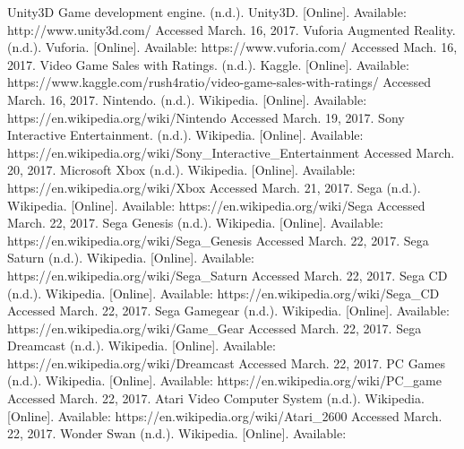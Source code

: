 

%
%

\begin{thebibliography}{1}
  Unity3D Game development engine. (n.d.). Unity3D. [Online]. Available:
  http://www.unity3d.com/
  Accessed March. 16, 2017.
  Vuforia Augmented Reality. (n.d.). Vuforia. [Online]. Available:
  https://www.vuforia.com/
  Accessed Mach. 16, 2017.
  Video Game Sales with Ratings. (n.d.). Kaggle. [Online]. Available:
  https://www.kaggle.com/rush4ratio/video-game-sales-with-ratings/
  Accessed March. 16, 2017.
  Nintendo. (n.d.). Wikipedia. [Online]. Available:
  https://en.wikipedia.org/wiki/Nintendo
  Accessed March. 19, 2017.
  Sony Interactive Entertainment. (n.d.). Wikipedia. [Online]. Available:
  https://en.wikipedia.org/wiki/Sony\_Interactive\_Entertainment
  Accessed March. 20, 2017.
  Microsoft Xbox (n.d.). Wikipedia. [Online]. Available:
  https://en.wikipedia.org/wiki/Xbox
  Accessed March. 21, 2017.
  Sega (n.d.). Wikipedia. [Online]. Available:
  https://en.wikipedia.org/wiki/Sega
  Accessed March. 22, 2017.
  Sega Genesis (n.d.). Wikipedia. [Online]. Available:
  https://en.wikipedia.org/wiki/Sega\_Genesis
  Accessed March. 22, 2017.
  Sega Saturn (n.d.). Wikipedia. [Online]. Available:
  https://en.wikipedia.org/wiki/Sega\_Saturn
  Accessed March. 22, 2017.
  Sega CD (n.d.). Wikipedia. [Online]. Available:
  https://en.wikipedia.org/wiki/Sega\_CD
  Accessed March. 22, 2017.
  Sega Gamegear (n.d.). Wikipedia. [Online]. Available:
  https://en.wikipedia.org/wiki/Game\_Gear
  Accessed March. 22, 2017.
  Sega Dreamcast (n.d.). Wikipedia. [Online]. Available:
  https://en.wikipedia.org/wiki/Dreamcast
  Accessed March. 22, 2017.
  PC Games (n.d.). Wikipedia. [Online]. Available:
  https://en.wikipedia.org/wiki/PC\_game
  Accessed March. 22, 2017.
  Atari Video Computer System (n.d.). Wikipedia. [Online]. Available:
  https://en.wikipedia.org/wiki/Atari\_2600
  Accessed March. 22, 2017.
  Wonder Swan (n.d.). Wikipedia. [Online]. Available:

\end{thebibliography}
